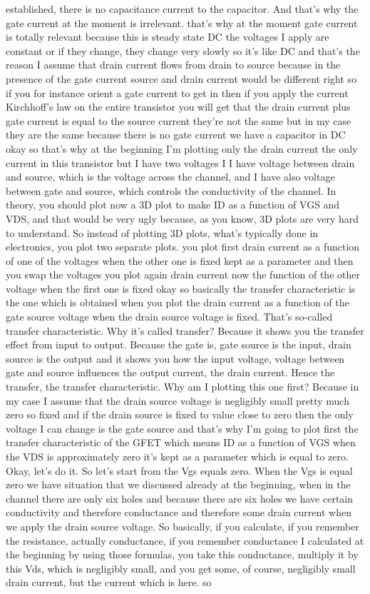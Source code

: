 established, there is no capacitance current to the capacitor. And that's why the gate current at the moment is irrelevant. that's why at the moment gate current is totally relevant because this is steady state DC the voltages I apply are constant or if they change, they change very slowly so it's like DC and that's the reason I assume that drain current flows from drain to source because in the presence of the gate current source and drain current would be different right so if you for instance orient a gate current to get in then if you apply the current Kirchhoff's law on the entire transistor you will get that the drain current plus gate current is equal to the source current they're not the same but in my case they are the same because there is no gate current we have a capacitor in DC okay so that's why at the beginning I'm plotting only the drain current the only current in this transistor but I have two voltages I I have voltage between drain and source, which is the voltage across the channel, and I have also voltage between gate and source, which controls the conductivity of the channel. In theory, you should plot now a 3D plot to make ID as a function of VGS and VDS, and that would be very ugly because, as you know, 3D plots are very hard to understand. So instead of plotting 3D plots, what's typically done in electronics, you plot two separate plots. you plot first drain current as a function of one of the voltages when the other one is fixed kept as a parameter and then you swap the voltages you plot again drain current now the function of the other voltage when the first one is fixed okay so basically the transfer characteristic is the one which is obtained when you plot the drain current as a function of the gate source voltage when the drain source voltage is fixed. That's so-called transfer characteristic. Why it's called transfer? Because it shows you the transfer effect from input to output. Because the gate is, gate source is the input, drain source is the output and it shows you how the input voltage, voltage between gate and source influences the output current, the drain current. Hence the transfer, the transfer characteristic. Why am I plotting this one first? Because in my case I assume that the drain source voltage is negligibly small pretty much zero so fixed and if the drain source is fixed to value close to zero then the only voltage I can change is the gate source and that's why I'm going to plot first the transfer characteristic of the GFET which means ID as a function of VGS when the VDS is approximately zero it's kept as a parameter which is equal to zero. Okay, let's do it. So let's start from the Vgs equals zero. When the Vgs is equal zero we have situation that we discussed already at the beginning, when in the channel there are only six holes and because there are six holes we have certain conductivity and therefore conductance and therefore some drain current when we apply the drain source voltage. So basically, if you calculate, if you remember the resistance, actually conductance, if you remember conductance I calculated at the beginning by using those formulas, you take this conductance, multiply it by this Vds, which is negligibly small, and you get some, of course, negligibly small drain current, but the current which is here. so 